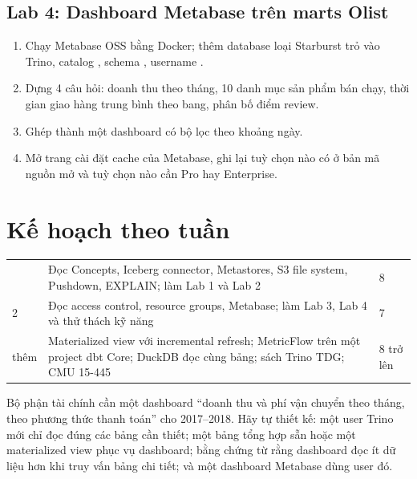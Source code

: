 \subsection{Lab 4: Dashboard Metabase trên marts Olist}
\begin{enumerate}
  \item Chạy Metabase OSS bằng Docker; thêm database loại Starburst trỏ vào Trino, catalog , schema , username .
  \item Dựng 4 câu hỏi: doanh thu theo tháng, 10 danh mục sản phẩm bán chạy, thời gian giao hàng trung bình theo bang, phân bố điểm review.
  \item Ghép thành một dashboard có bộ lọc theo khoảng ngày.
  \item Mở trang cài đặt cache của Metabase, ghi lại tuỳ chọn nào có ở bản mã nguồn mở và tuỳ chọn nào cần Pro hay Enterprise.
\end{enumerate}

\section{Kế hoạch theo tuần}
\begin{xltabular}{\textwidth}{@{}P{1.6cm} L P{1.8cm}@{}}
\toprule
{} &  &  \\
\midrule
\endhead
\bottomrule
{} & Đọc Concepts, Iceberg connector, Metastores, S3 file system, Pushdown, EXPLAIN; làm Lab 1 và Lab 2 & 8 \\
2 & Đọc access control, resource groups, Metabase; làm Lab 3, Lab 4 và thử thách kỹ năng & 7 \\
thêm & Materialized view với incremental refresh; MetricFlow trên một project dbt Core; DuckDB đọc cùng bảng; sách Trino TDG; CMU 15-445 & 8 trở lên \\
\end{xltabular}

\begin{thuthach}
Bộ phận tài chính cần một dashboard ``doanh thu và phí vận chuyển theo tháng, theo phương thức thanh toán'' cho 2017--2018. Hãy tự thiết kế: một user Trino mới chỉ đọc đúng các bảng cần thiết; một bảng tổng hợp sẵn hoặc một materialized view phục vụ dashboard; bằng chứng từ  rằng dashboard đọc ít dữ liệu hơn khi truy vấn bảng chi tiết; và một dashboard Metabase dùng user đó.
\end{thuthach}

